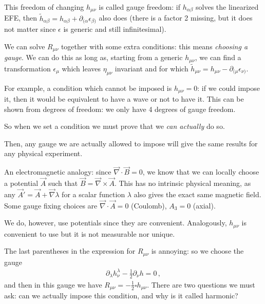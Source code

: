 \documentclass[main.tex]{subfiles}
\begin{document}
This freedom of changing \(h_{\mu \nu }\) is called gauge freedom: if \(h_{\alpha \beta }\) solves the linearized EFE, then \(\widetilde{h}_{\alpha \beta } = h_{\alpha \beta } + \partial_{(\alpha } \epsilon_{\beta )}\) also does (there is a factor 2 missing, but it does not matter since \(\epsilon \) is generic and still infinitesimal). 

We can solve \(R_{\mu \nu } \) together with some extra conditions: this means \emph{choosing a gauge}. 
We can do this as long as, starting from a generic \(h_{\mu \nu }\), we can find a transformation \(\epsilon_{\mu }\) which leaves \(\eta_{\mu \nu } \) invariant and for which \(\widetilde{h}_{\mu \nu } = h_{\mu \nu } - \partial_{(\mu } \epsilon_{\nu )}\). 

For example, a condition which cannot be imposed is \(h_{\mu \nu } =0\): if we could impose it, then it would be equivalent to have a wave or not to have it. 
This can be shown from degrees of freedom: we only have 4 degrees of gauge freedom. 

So when we set a condition we must prove that we \emph{can actually} do so. 

Then, any gauge we are actually allowed to impose will give the same results for any physical experiment. 

An electromagnetic analogy: since \(\vec{\nabla} \cdot \vec{B} = 0\), we know that we can locally choose a potential \(\vec{A} \) such that \(\vec{B} = \vec{\nabla} \times \vec{A}\). This has no intrinsic physical meaning, as any \(\vec{A}' = \vec{A} + \vec{\nabla} \lambda \) for a scalar function \(\lambda \) also gives the exact same magnetic field. 
Some gauge fixing choices are \(\vec{\nabla} \cdot \vec{A} = 0\) (Coulomb), \(A_{3} = 0\) (axial). 

We do, however, use potentials since they are convenient. 
Analogously, \(h_{\mu \nu }\) is convenient to use but it is not measurable nor unique. 


The last parentheses in the expression for \(R_{\mu \nu } \) is annoying: so we choose the gauge 
%
\begin{align}
\partial_{\lambda } h^{\lambda  }_{\nu } - \frac{1}{2} \partial_{\nu } h = 0
\,,
\end{align}
%
and then in this gauge we have \(R_{\mu \nu } = - \frac{1}{2}  \square h_{\mu \nu }\). 
There are two questions we must ask: can we actually impose this condition, and why is it called harmonic? 
\end{document}
